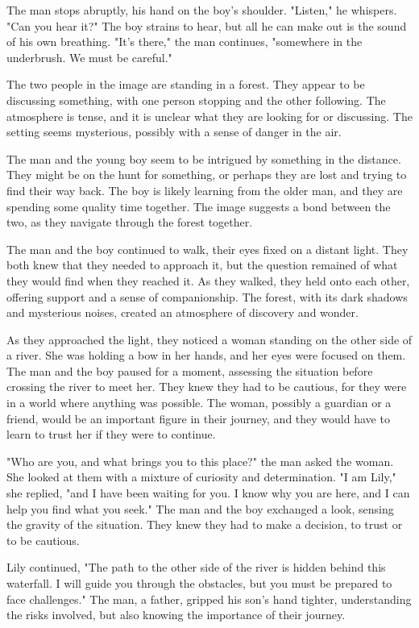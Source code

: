 \documentclass[smalldemyvopaper,11pt,twoside,onecolumn,openright,extrafontsizes]{memoir}
\begin{document}
The man stops abruptly, his hand on the boy's shoulder. "Listen," he whispers. "Can you hear it?" The boy strains to hear, but all he can make out is the sound of his own breathing. "It's there," the man continues, "somewhere in the underbrush. We must be careful."\par
The two people in the image are standing in a forest. They appear to be discussing something, with one person stopping and the other following. The atmosphere is tense, and it is unclear what they are looking for or discussing. The setting seems mysterious, possibly with a sense of danger in the air.\par
The man and the young boy seem to be intrigued by something in the distance. They might be on the hunt for something, or perhaps they are lost and trying to find their way back. The boy is likely learning from the older man, and they are spending some quality time together. The image suggests a bond between the two, as they navigate through the forest together.\par
The man and the boy continued to walk, their eyes fixed on a distant light. They both knew that they needed to approach it, but the question remained of what they would find when they reached it. As they walked, they held onto each other, offering support and a sense of companionship. The forest, with its dark shadows and mysterious noises, created an atmosphere of discovery and wonder.\par
As they approached the light, they noticed a woman standing on the other side of a river. She was holding a bow in her hands, and her eyes were focused on them. The man and the boy paused for a moment, assessing the situation before crossing the river to meet her. They knew they had to be cautious, for they were in a world where anything was possible. The woman, possibly a guardian or a friend, would be an important figure in their journey, and they would have to learn to trust her if they were to continue.\par
"Who are you, and what brings you to this place?" the man asked the woman. She looked at them with a mixture of curiosity and determination. "I am Lily," she replied, "and I have been waiting for you. I know why you are here, and I can help you find what you seek." The man and the boy exchanged a look, sensing the gravity of the situation. They knew they had to make a decision, to trust or to be cautious.\par
Lily continued, "The path to the other side of the river is hidden behind this waterfall. I will guide you through the obstacles, but you must be prepared to face challenges." The man, a father, gripped his son's hand tighter, understanding the risks involved, but also knowing the importance of their journey.\par
\end{document}
